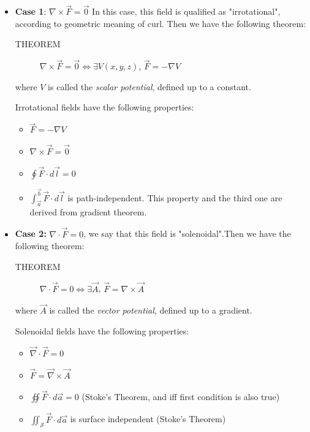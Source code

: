 \documentclass[12pt,a4paper,twoside]{article}
\numberwithin{equation}{section}
\begin{document}
    \begin{itemize}
        \item \textbf{Case 1}: \(\nabla\times \overrightarrow{F}=\overrightarrow{0}\)
        In this case, this field is qualified as "irrotational", according to geometric meaning of curl. Then we have the following theorem:
        \begin{description}
	        \item[THEOREM] $\nabla\times\overrightarrow{F} = \overrightarrow{0}\iff \exists V(x,y,z)$, $\overrightarrow{F}=-\nabla V$
        \end{description}
        where $V$ is called the \textit{scalar potential}, defined up to a constant.
        
        Irrotational fields have the following properties:
        \begin{itemize}
            \item \(\overrightarrow{F}=-\nabla V\)
            \item \(\nabla \times \overrightarrow{F}=\overrightarrow{0}\) 
            \item \(\oint \overrightarrow{F}\cdot d\overrightarrow{l}=0\)
            \item \(\int_{\overrightarrow{a}}^{\overrightarrow{b}}\overrightarrow{F}\cdot d\overrightarrow{l}\) is path-independent. This property and the third one are derived from gradient theorem.
        \end{itemize}
        
        \item \textbf{Case 2:} \(\nabla\cdot \overrightarrow{F}=0\), we say that this field is "solenoidal".Then we have the following theorem:
        \begin{description}
	        \item[THEOREM] $\nabla\cdot\overrightarrow{F} = 0\iff \exists\overrightarrow{A}$, $\overrightarrow{F}=\nabla\times\overrightarrow{A}$
        \end{description}
        where $\overrightarrow{A}$ is called the \textit{vector potential}, defined up to a gradient.
        
        Solenoidal fields have the following properties:
        \begin{itemize}
            \item \(\overrightarrow{\nabla}\cdot\overrightarrow{F}=0\)
            \item \(\overrightarrow{F}=\overrightarrow{\nabla}\times\overrightarrow{A}\)
            \item \(\oiint \overrightarrow{F}\cdot d\overrightarrow{a}=0\) (Stoke's Theorem, and iff first condition is also true)
            \item \(\iint_\mathcal{S}\overrightarrow{F}\cdot d\overrightarrow{a}\) is surface independent (Stoke's Theorem)
        \end{itemize}
    \end{itemize}
	
\end{document}
